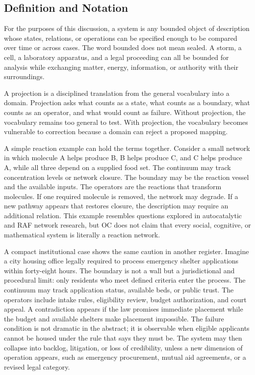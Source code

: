 \documentclass[11pt,a4paper,openany]{book}
\begin{document}
\subsection{Definition and Notation}
For the purposes of this discussion, a system is any bounded object of description whose states, relations, or operations can be specified enough to be compared over time or across cases. The word bounded does not mean sealed. A storm, a cell, a laboratory apparatus, and a legal proceeding can all be bounded for analysis while exchanging matter, energy, information, or authority with their surroundings. \cite{nicolis_prigogine_selforg,kauffman_autocatalytic}\par
A projection is a disciplined translation from the general vocabulary into a domain. Projection asks what counts as a state, what counts as a boundary, what counts as an operator, and what would count as failure. Without projection, the vocabulary remains too general to test. With projection, the vocabulary becomes vulnerable to correction because a domain can reject a proposed mapping.\par
A simple reaction example can hold the terms together. Consider a small network in which molecule A helps produce B, B helps produce C, and C helps produce A, while all three depend on a supplied food set. The continuum may track concentration levels or network closure. The boundary may be the reaction vessel and the available inputs. The operators are the reactions that transform molecules. If one required molecule is removed, the network may degrade. If a new pathway appears that restores closure, the description may require an additional relation. This example resembles questions explored in autocatalytic and RAF network research, but OC does not claim that every social, cognitive, or mathematical system is literally a reaction network.\par
A compact institutional case shows the same caution in another register. Imagine a city housing office legally required to process emergency shelter applications within forty-eight hours. The boundary is not a wall but a jurisdictional and procedural limit: only residents who meet defined criteria enter the process. The continuum may track application status, available beds, or public trust. The operators include intake rules, eligibility review, budget authorization, and court appeal. A contradiction appears if the law promises immediate placement while the budget and available shelters make placement impossible. The failure condition is not dramatic in the abstract; it is observable when eligible applicants cannot be housed under the rule that says they must be. The system may then collapse into backlog, litigation, or loss of credibility, unless a new dimension of operation appears, such as emergency procurement, mutual aid agreements, or a revised legal category.\par
\end{document}
